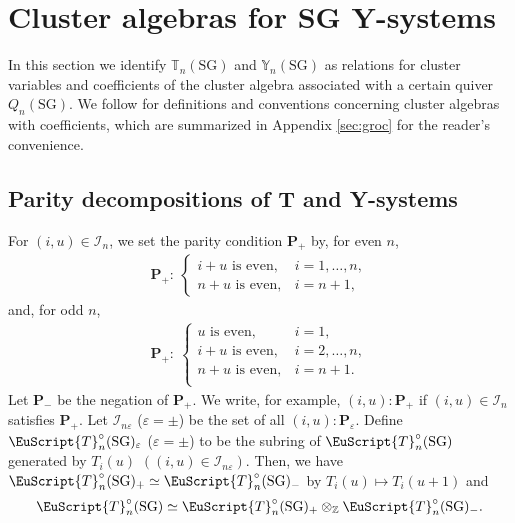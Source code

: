 \section{Cluster algebras for SG Y-systems}
\label{sec:clusterSG}

In this section we identify $\mathbb{T}_{n}(\mathrm{SG})$ and
$\mathbb{Y}_{n}(\mathrm{SG})$ as relations for cluster variables
and coef\/f\/icients of the cluster algebra
associated with a certain quiver $Q_{n}(\mathrm{SG})$.
We follow \cite{Fomin07}
 for def\/initions and conventions concerning cluster algebras
with coef\/f\/icients,
which are summarized in Appendix \ref{sec:groc} for the reader's
convenience.

\subsection{Parity decompositions of T and Y-systems}


For $(i,u)\in \mathcal{I}_{n}$,
we set the parity condition $\mathbf{P}_{+}$ by,
for even $n$,
\begin{gather*}
\mathbf{P}_{+}: \
\begin{cases}
\mbox{$i+u$ is even},& i=1,\dots,n,\\
\mbox{$n+u$ is even}, & i=n+1,
\end{cases}
\end{gather*}
and, for odd $n$,
\begin{gather*}
\mathbf{P}_{+}: \
\begin{cases}
\mbox{$u$ is even}, & i=1,\\
\mbox{$i+u$ is even}, & i=2,\dots,n, \\
\mbox{$n+u$ is even}, & i=n+1.\\
\end{cases}
\end{gather*}
Let $\mathbf{P}_-$ be the negation of $\mathbf{P}_+$.
We write, for example, $(i,u):\mathbf{P}_{+}$ if $(i,u)\in
\mathcal{I}_n$ satisf\/ies
$\mathbf{P}_{+}$.
Let $\mathcal{I}_{n\varepsilon}$ ($\varepsilon=\pm$)
be the set of all $(i,u):\mathbf{P}_{\varepsilon}$.
Def\/ine $\EuScript{T}^{\circ}_{n}(\mathrm{SG})_{\varepsilon}$
($\varepsilon=\pm$)
to be the subring of $\EuScript{T}^{\circ}_{n}(\mathrm{SG})$
generated by
 $T_i(u)$
$((i,u)\in \mathcal{I}_{n\varepsilon})$.
Then, we have
$\EuScript{T}^{\circ}_{n}(\mathrm{SG})_+
\simeq
\EuScript{T}^{\circ}_{n}(\mathrm{SG})_-
$
by $T_i(u)\mapsto T_i(u+1)$ and
\begin{gather*}
\EuScript{T}^{\circ}_{n}(\mathrm{SG})
\simeq
\EuScript{T}^{\circ}_{n}(\mathrm{SG})_+
\otimes_{\mathbb{Z}}
\EuScript{T}^{\circ}_{n}(\mathrm{SG})_-.
\end{gather*}

